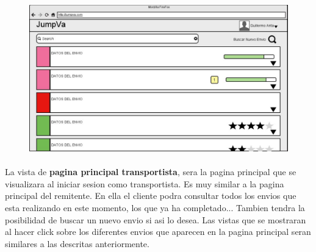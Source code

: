 \documentclass[10pt, a4paper,spanish]{article}
\begin{document}
			\begin{figure}[H]
				\centering
				\begin{minipage}[b]{0.7\textwidth}
					\includegraphics[width=\textwidth]{res/PaginaPrincipalTransportista.png}

				\end{minipage}
			\end{figure}

			\paragraph{}
			La vista de \textbf{pagina principal transportista}, sera la pagina principal que se visualizara al iniciar sesion como transportista. Es muy similar a la pagina principal del remitente. En ella el cliente podra consultar todos los envios que esta realizando en este momento, los que ya ha completado... Tambien tendra la posibilidad de buscar un nuevo envio si asi lo desea. Las vistas que se mostraran al hacer click sobre los diferentes envios que aparecen en la pagina principal seran similares a las descritas anteriormente.
\end{document}
